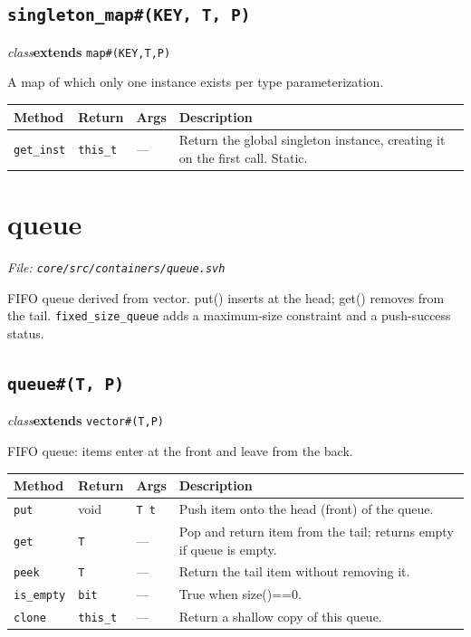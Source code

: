 \documentclass[11pt,letterpaper]{report}
\begin{document}
\subsection*{\texttt{singleton\_map\#(KEY, T, P)}}
\noindent\small\textit{class}\quad \textbf{extends} \texttt{map\#(KEY,T,P)}\par

A map of which only one instance exists per type parameterization.

\begin{xltabular}{\linewidth}{>{\small}p{1.35in} >{\small}p{1.25in} >{\small}p{0.95in} >{\small}X}
\toprule
\textbf{Method} & \textbf{Return} & \textbf{Args} & \textbf{Description} \\
\midrule
\endhead
\bottomrule
\endfoot
\texttt{get\_inst} & \texttt{this\_t} & --- & Return the global singleton instance, creating it on the first call. Static. \\
\end{xltabular}

\section{queue}
\noindent\small\textit{File: \texttt{core/src/containers/queue.svh}}\par

FIFO queue derived from vector. put() inserts at the head; get() removes from the tail. \texttt{fixed\_size\_queue} adds a maximum-size constraint and a push-success status.

\subsection*{\texttt{queue\#(T, P)}}
\noindent\small\textit{class}\quad \textbf{extends} \texttt{vector\#(T,P)}\par

FIFO queue: items enter at the front and leave from the back.

\begin{xltabular}{\linewidth}{>{\small}p{1.35in} >{\small}p{1.25in} >{\small}p{0.95in} >{\small}X}
\toprule
\textbf{Method} & \textbf{Return} & \textbf{Args} & \textbf{Description} \\
\midrule
\endhead
\bottomrule
\endfoot
\texttt{put} & void & \texttt{T t} & Push item onto the head (front) of the queue. \\
\texttt{get} & \texttt{T} & --- & Pop and return item from the tail; returns empty if queue is empty. \\
\texttt{peek} & \texttt{T} & --- & Return the tail item without removing it. \\
\texttt{is\_empty} & \texttt{bit} & --- & True when size()==0. \\
\texttt{clone} & \texttt{this\_t} & --- & Return a shallow copy of this queue. \\
\end{xltabular}
\end{document}
